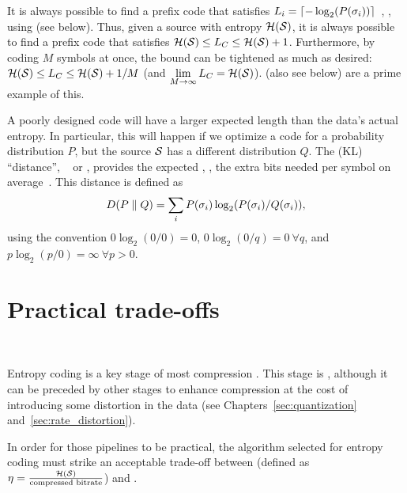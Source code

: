 It is always possible to find a prefix code that satisfies
$L_i = \left\lceil -\log_2(P(\sigma_i))\right\rceil$~\cite[\S 2.4.2, \S 2.4.3]{sayood_introduction},
\eg, using  (see below).
Thus, given a source with entropy $\mathcal{H}(\mathcal{S})$, it is always possible to
find a prefix code that satisfies $\mathcal{H}(\mathcal{S}) \le L_C \le \mathcal{H}(\mathcal{S}) + 1$.
%
Furthermore, by coding
$M$ symbols at once, the bound can be tightened as much as desired:
\mbox{$\mathcal{H}(\mathcal{S}) \le L_C \le \mathcal{H}(\mathcal{S}) + 1/M$}
(and $\displaystyle \lim_{M\rightarrow\infty} L_C = \mathcal{H}(\mathcal{S})$).
 (also see below) are a prime example of this.

A poorly designed code will have a larger expected length than
the data's actual entropy. In particular, this will happen if we optimize a code
for a probability distribution $P$, but the source $\mathcal{S}$ has a different
distribution $Q$. The  (KL) ``distance'',
\aka\  or , provides
the expected , \ie, the extra bits needed per symbol on
average~\cite[\S 2.3, Theorem 5.4.3]{cover_elements}. This distance is defined
as $$D(P \parallel Q) = \sum_i P(\sigma_i) \log_2(P(\sigma_i)/Q(\sigma_i)),$$
using the convention $0 \log_2(0/0) = 0$, $0 \log_2(0/q) = 0\ \forall q$, and
$p \log_2(p/0) = \infty\ \forall p > 0$.

\section{Practical trade-offs}~\label{sec:coding:trade_offs}

Entropy coding is a key stage of most compression .
This stage is ,
although it can be preceded by other 
stages to enhance compression at the cost of introducing some distortion in the data
(see Chapters~\ref{sec:quantization} and~\ref{sec:rate_distortion}).

In order for those pipelines to be practical, the algorithm selected for entropy coding
must strike an acceptable trade-off between  (defined as $\eta = \frac{\mathcal{H}(\mathcal{S})}{\textrm{compressed bitrate}}$) and .

